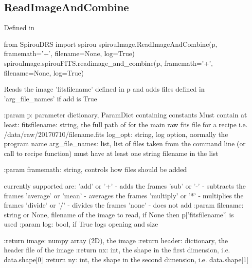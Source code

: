 \begin{minipage}{\textwidth}
\subsection{ReadImageAndCombine}

Defined in \spirouImage{}

\begin{pythonbox}
from SpirouDRS import spirou
spirouImage.ReadImageAndCombine(p, framemath='+', filename=None, log=True)
spirouImage.spirouFITS.readimage_and_combine(p, framemath='+', filename=None, log=True)
\end{pythonbox}

\begin{pythondocstring}
Reads the image 'fitsfilename' defined in p and adds files defined in
'arg_file_names' if add is True

:param p: parameter dictionary, ParamDict containing constants
    Must contain at least:
            fitsfilename: string, the full path of for the main raw fits
                  file for a recipe
                  i.e. /data/raw/20170710/filename.fits
            log_opt: string, log option, normally the program name
            arg_file_names: list, list of files taken from the command line
                            (or call to recipe function) must have at least
                            one string filename in the list

:param framemath: string, controls how files should be added

            currently supported are:
            'add' or '+'           - adds the frames
            'sub' or '-'           - subtracts the frames
            'average' or 'mean'    - averages the frames
            'multiply' or '*'      - multiplies the frames
            'divide' or '/'        - divides the frames
            'none'                 - does not add
:param filename: string or None, filename of the image to read, if None
                 then p['fitsfilename'] is used
:param log: bool, if True logs opening and size

:return image: numpy array (2D), the image
:return header: dictionary, the header file of the image
:return nx: int, the shape in the first dimension, i.e. data.shape[0]
:return ny: int, the shape in the second dimension, i.e. data.shape[1]
\end{pythondocstring}
\end{minipage}

